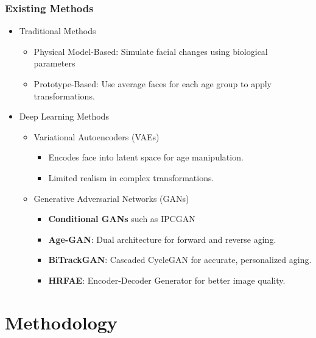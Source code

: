 \documentclass[aspectratio=169]{beamer}
\begin{document}
\begin{frame}
\frametitle{Existing Methods}
\justifying

\begin{itemize}
    \item Traditional Methods
    \begin{itemize}
            \item Physical Model-Based: Simulate facial changes using biological parameters
            \item Prototype-Based: Use average faces for each age group to apply transformations.
    \end{itemize}
\end{itemize}

\begin{itemize}
    \item Deep Learning Methods
    \begin{itemize}
            \item Variational Autoencoders (VAEs) \cite{VAE}
            \begin{itemize}
                \item Encodes face into latent space for age manipulation.
                \item Limited realism in complex transformations.
            \end{itemize}
            \item Generative Adversarial Networks (GANs)
            \begin{itemize}
                \item \textbf{Conditional GANs} \cite{CGAN} such as IPCGAN \cite{IPCGAN}
                \item\textbf{Age-GAN}: Dual architecture for forward and reverse aging. \cite{ageGAN}
                \item \textbf{BiTrackGAN}: Cascaded CycleGAN for accurate, personalized aging. \cite{BiTrackGAN}
                \item \textbf{HRFAE}: Encoder-Decoder Generator for better image quality. \cite{HRFAE}
            \end{itemize}
    \end{itemize}
\end{itemize}

\end{frame}

\section{Methodology}
\end{document}
